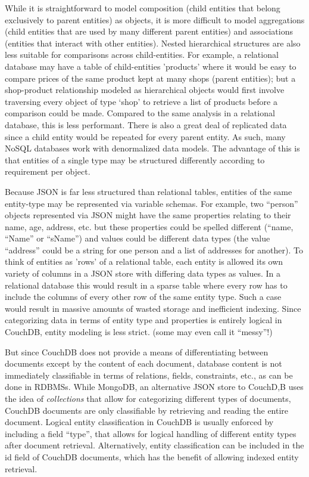 While it is straightforward to model composition (child entities that belong exclusively to parent entities) as objects, it is more difficult to model aggregations (child entities that are used by many different parent entities) and associations (entities that interact with other entities). Nested hierarchical structures are also less suitable for comparisons across child-entities. For example, a relational database may have a table of child-entities 'products' where it would be easy to compare prices of the same product kept at many shops (parent entities); but a shop-product relationship modeled as hierarchical objects would first involve traversing every object of type `shop' to retrieve a list of products before a comparison could be made. Compared to the same analysis in a relational database, this is less performant. There is also a great deal of replicated data since a child entity would be repeated for every parent entity. As such, many NoSQL databases work with denormalized data models. The advantage of this is that entities of a single type may be structured differently according to requirement per object.

Because JSON is far less structured than relational tables, entities of the same entity-type may be represented via variable schemas. For example, two ``person'' objects represented via JSON might have the same properties relating to their name, age, address, etc. but these properties could be spelled different (``name, ``Name'' or ``sName'') and values could be different data types (the value ``address'' could be a string for one person and a list of addresses for another). To think of entities as 'rows' of a relational table, each entity is allowed its own variety of columns in a JSON store with differing data types as values. In a relational database this would result in a sparse table where every row has to include the columns of every other row of the same entity type. Such a case would result in massive amounts of wasted storage and inefficient indexing. Since categorizing data in terms of entity type and properties is entirely logical in CouchDB, entity modeling is less strict. (some may even call it ``messy''!)

But since CouchDB does not provide a means of differentiating between documents except by the content of each document, database content is not immediately classifiable in terms of relations, fields, constraints, etc., as can be done in RDBMSs. While MongoDB, an alternative JSON store to CouchD,B uses the idea of \textit{collections} that allow for categorizing different types of documents, CouchDB documents are only classifiable by retrieving and reading the entire document. Logical entity classification in CouchDB is usually enforced by including a field ``type'', that allows for logical handling of different entity types after document retrieval. Alternatively, entity classification can be included in the id field of CouchDB documents, which has the benefit of allowing indexed entity retrieval.